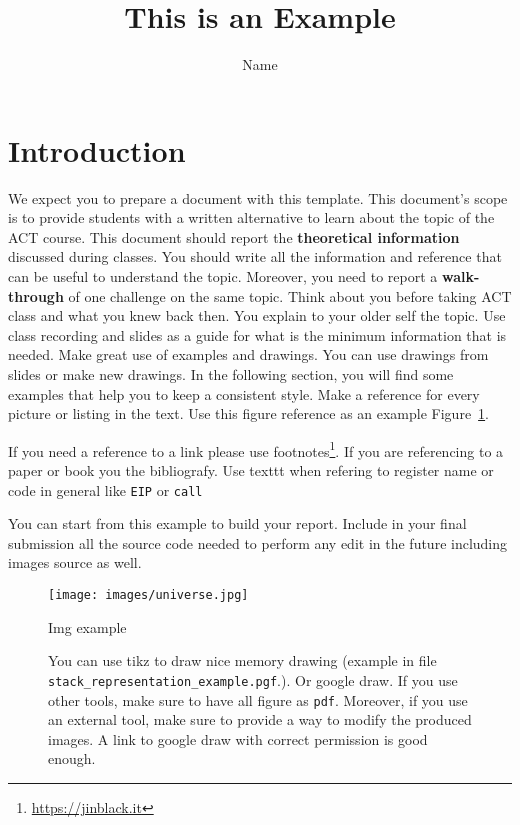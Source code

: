 \documentclass{article}
\author{Name}
\title{This is an Example}
\date{}
\begin{document}
\maketitle

\section{Introduction}

We expect you to prepare a document with this template. This document's scope is to provide students with a written alternative to learn about the topic of the ACT course.
This document should report the \textbf{theoretical information} discussed during classes. You should write all the information and reference that can be useful to understand the topic. Moreover, you need to report a \textbf{walk-through} of one challenge on the same topic.
Think about you before taking ACT class and what you knew back then. You explain to your older self the topic.
Use class recording and slides as a guide for what is the minimum information that is needed.
Make great use of examples and drawings. You can use drawings from slides or make new drawings.
In the following section, you will find some examples that help you to keep a consistent style.
Make a reference for every picture or listing in the text. Use this figure reference as an example Figure~\ref{fig:universe}. 

If you need a reference to a link please use footnotes\footnote{\url{https://jinblack.it}}. If you are referencing to a paper or book you the bibliografy.\citep{adams1995hitchhiker}
Use texttt when refering to register name or code in general like \texttt{EIP} or \texttt{call}

You can start from this example to build your report. Include in your final submission all the source code needed to perform any edit in the future including images source as well.

\begin{figure}[tbh]
\centering
\texttt{[image: images/universe.jpg]}
\caption{Img example}
\label{fig:universe}
\end{figure}

\begin{figure}[tbh]
\centering

 \caption{You can use tikz to draw nice memory drawing (example in file \texttt{stack\_representation\_example.pgf}.). Or google draw.  If you use other tools, make sure to have all figure as \texttt{pdf}. Moreover, if you use an external tool, make sure to provide a way to modify the produced images. A link to google draw with correct permission is good enough.}
\label{general-stolen-api}
\end{figure} 
\end{document}
